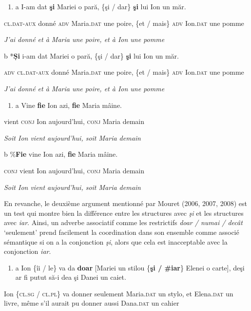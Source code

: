 \begin{enumerate}
\item \label{bkm:Ref302401530}a  I-am dat \textbf{şi} Mariei o pară, \{şi / dar\} \textbf{şi} lui Ion un măr.


\end{enumerate}
\textsc{cl.dat-aux} donné \textsc{adv} Maria.\textsc{dat} une poire, \{et / mais\} \textsc{adv} Ion.\textsc{dat} une pomme

{\itshape
J'ai donné et à Maria une poire, et à Ion une pomme}

  b  *\textbf{Și} i-am dat Mariei o pară, \{şi / dar\} \textbf{şi} lui Ion un măr.

    \textsc{adv cl.dat-aux} donné Maria.\textsc{dat} une poire, \{et / mais\} \textsc{adv} Ion.\textsc{dat} une pomme

{\itshape
J'ai donné et à Maria une poire, et à Ion une pomme} 


\begin{enumerate}
\item \label{bkm:Ref302401557}a  Vine \textbf{fie} Ion azi, \textbf{fie} Maria mâine.


\end{enumerate}
vient \textsc{conj} Ion aujourd'hui, \textsc{conj} Maria demain

{\itshape
Soit Ion vient aujourd'hui, soit Maria demain}

  b  \%\textbf{Fie} vine Ion azi, \textbf{fie} Maria mâine.

    \textsc{conj} vient Ion aujourd'hui, \textsc{conj} Maria demain

{\itshape
Soit Ion vient aujourd'hui, soit Maria demain} 

En revanche, le deuxième argument mentionné par Mouret (2006, 2007, 2008) est un test qui montre bien la différence entre les structures avec \textit{şi} et les structures avec \textit{iar}. Ainsi, un adverbe associatif comme les restrictifs \textit{doar / numai / decât} `seulement' prend facilement la coordination dans son ensemble comme associé sémantique si on a la conjonction \textit{şi}, alors que cela est inacceptable avec la conjonction \textit{iar}.


\begin{enumerate}
\item a  Ion \{îi / le\} va da \textbf{doar} [Mariei un stilou \{\textbf{şi / \#iar}\} Elenei o carte], deşi ar fi putut să-i dea şi Danei un caiet.


\end{enumerate}
Ion \{\textsc{cl.sg / cl.pl\}} va donner seulement Maria.\textsc{dat} un stylo, et Elena\textsc{.dat} un livre, même s'il aurait pu donner aussi Dana\textsc{.dat} un cahier

